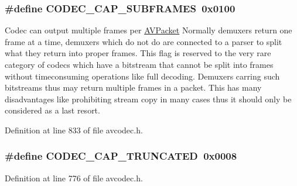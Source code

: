 \subsubsection[{\texorpdfstring{C\+O\+D\+E\+C\+\_\+\+C\+A\+P\+\_\+\+S\+U\+B\+F\+R\+A\+M\+ES}{CODEC_CAP_SUBFRAMES}}]{\setlength{\rightskip}{0pt plus 5cm}\#define C\+O\+D\+E\+C\+\_\+\+C\+A\+P\+\_\+\+S\+U\+B\+F\+R\+A\+M\+ES~0x0100}\hypertarget{group__lavc__core_ga6e996607a6c9605e880c351b8d0437ad}{}\label{group__lavc__core_ga6e996607a6c9605e880c351b8d0437ad}
Codec can output multiple frames per \hyperlink{struct_a_v_packet}{A\+V\+Packet} Normally demuxers return one frame at a time, demuxers which do not do are connected to a parser to split what they return into proper frames. This flag is reserved to the very rare category of codecs which have a bitstream that cannot be split into frames without timeconsuming operations like full decoding. Demuxers carring such bitstreams thus may return multiple frames in a packet. This has many disadvantages like prohibiting stream copy in many cases thus it should only be considered as a last resort. 

Definition at line 833 of file avcodec.\+h.

\subsubsection[{\texorpdfstring{C\+O\+D\+E\+C\+\_\+\+C\+A\+P\+\_\+\+T\+R\+U\+N\+C\+A\+T\+ED}{CODEC_CAP_TRUNCATED}}]{\setlength{\rightskip}{0pt plus 5cm}\#define C\+O\+D\+E\+C\+\_\+\+C\+A\+P\+\_\+\+T\+R\+U\+N\+C\+A\+T\+ED~0x0008}\hypertarget{group__lavc__core_ga8783bdc2c37a5b8a0862450a482b6816}{}\label{group__lavc__core_ga8783bdc2c37a5b8a0862450a482b6816}


Definition at line 776 of file avcodec.\+h.

